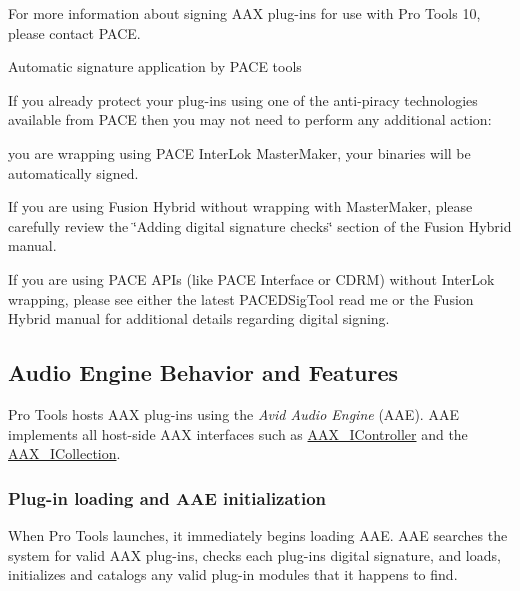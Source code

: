 For more information about signing A\+A\+X plug-\/ins for use with Pro Tools 10, please contact P\+A\+C\+E.

 Automatic signature application by P\+A\+C\+E tools

If you already protect your plug-\/ins using one of the anti-\/piracy technologies available from P\+A\+C\+E then you may not need to perform any additional action\+:


\begin{DoxyItemize}
\item you are wrapping using P\+A\+C\+E Inter\+Lok Master\+Maker, your binaries will be automatically signed.  
\item If you are using Fusion Hybrid without wrapping with Master\+Maker, please carefully review the \char`\"{}\+Adding digital signature checks\char`\"{} section of the Fusion Hybrid manual.  
\item If you are using P\+A\+C\+E A\+P\+Is (like P\+A\+C\+E Interface or C\+D\+R\+M) without Inter\+Lok wrapping, please see either the latest P\+A\+C\+E\+D\+Sig\+Tool read me or the Fusion Hybrid manual for additional details regarding digital signing.  
\end{DoxyItemize}



 \hypertarget{a00360_aax_pro_tools_guide_03_audio_engine_behavior}{}\subsection{Audio Engine Behavior and Features}\label{a00360_aax_pro_tools_guide_03_audio_engine_behavior}
 Pro Tools hosts A\+A\+X plug-\/ins using the {\itshape  Avid Audio Engine} (A\+A\+E). A\+A\+E implements all host-\/side A\+A\+X interfaces such as \hyperlink{a00090}{A\+A\+X\+\_\+\+I\+Controller} and the \hyperlink{a00087}{A\+A\+X\+\_\+\+I\+Collection}.

\hypertarget{a00360_subsection__plugin_loading_and_aae_initialization}{}\subsubsection{Plug-\/in loading and A\+A\+E initialization}\label{a00360_subsection__plugin_loading_and_aae_initialization}
 When Pro Tools launches, it immediately begins loading A\+A\+E. A\+A\+E searches the system for valid A\+A\+X plug-\/ins, checks each plug-\/in\textquotesingle{}s digital signature, and loads, initializes and catalogs any valid plug-\/in modules that it happens to find.

